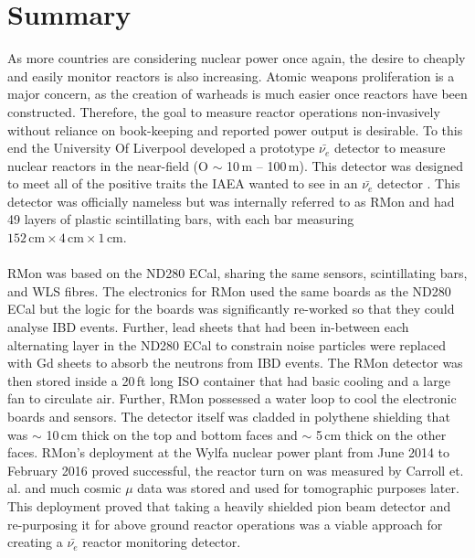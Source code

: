 
\chapter{Summary}

\ifpdf
    \graphicspath{{Chapter7/Figs/Raster/}{Chapter6/Figs/PDF/}{Chapter6/Figs/}}
\else
    \graphicspath{{Chapter7/Figs/Vector/}{Chapter7/Figs/}}
\fi

As more countries are considering nuclear power once again, the desire to cheaply and easily monitor reactors is also increasing. Atomic weapons proliferation is a major concern, as the creation of warheads is much easier once reactors have been constructed. Therefore, the goal to measure reactor operations non-invasively without reliance on book-keeping and reported power output is desirable. To this end the University Of Liverpool developed a prototype $\bar{\nu_e}$ detector to measure nuclear reactors in the near-field (O $\sim$ 10\,m -- 100\,m). This detector was designed to meet all of the positive traits the IAEA wanted to see in an $\bar{\nu_e}$ detector \cite{IAEA_2008}. This detector was officially nameless but was internally referred to as RMon and had 49 layers of plastic scintillating bars, with each bar measuring $152\,\textrm{cm} \times 4\,\textrm{cm} \times 1\,\textrm{cm}$.
\\\\RMon was based on the ND280 ECal, sharing the same sensors, scintillating bars, and WLS fibres. The electronics for RMon used the same boards as the ND280 ECal but the logic for the boards was significantly re-worked so that they could analyse IBD events. Further, lead sheets that had been in-between each alternating layer in the ND280 ECal to constrain noise particles were replaced with Gd sheets to absorb the neutrons from IBD events. The RMon detector was then stored inside a 20\,ft long ISO container that had basic cooling and a large fan to circulate air. Further, RMon possessed a water loop to cool the electronic boards and sensors. The detector itself was cladded in polythene shielding that was $\sim$ 10\,cm thick on the top and bottom faces and $\sim$ 5\,cm thick on the other faces. RMon's deployment at the Wylfa nuclear power plant from June 2014 to February 2016 proved successful, the reactor turn on was measured by Carroll et. al. \cite{Carroll_2018} and much cosmic $\mu$ data was stored and used for tomographic purposes later. This deployment proved that taking a heavily shielded pion beam detector and re-purposing it for above ground reactor operations was a viable approach for creating a $\bar{\nu_e}$ reactor monitoring detector. 

